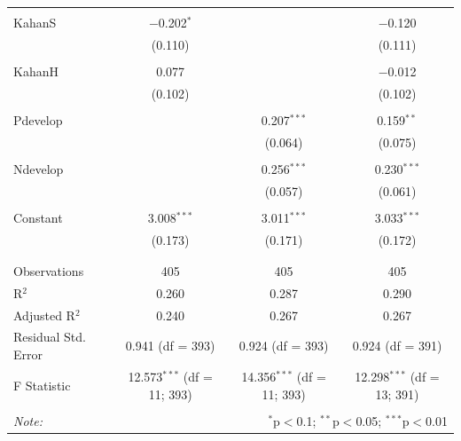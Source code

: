 \documentclass[
]{article}
\begin{document}
\begin{table}[!htbp]
\begin{tabular}{@{\extracolsep{5pt}}lccc}
  & & & \\ 
 KahanS & $-$0.202$^{*}$ &  & $-$0.120 \\ 
  & (0.110) &  & (0.111) \\ 
  & & & \\ 
 KahanH & 0.077 &  & $-$0.012 \\ 
  & (0.102) &  & (0.102) \\ 
  & & & \\ 
 Pdevelop &  & 0.207$^{***}$ & 0.159$^{**}$ \\ 
  &  & (0.064) & (0.075) \\ 
  & & & \\ 
 Ndevelop &  & 0.256$^{***}$ & 0.230$^{***}$ \\ 
  &  & (0.057) & (0.061) \\ 
  & & & \\ 
 Constant & 3.008$^{***}$ & 3.011$^{***}$ & 3.033$^{***}$ \\ 
  & (0.173) & (0.171) & (0.172) \\ 
  & & & \\ 
\hline \\[-1.8ex] 
Observations & 405 & 405 & 405 \\ 
R$^{2}$ & 0.260 & 0.287 & 0.290 \\ 
Adjusted R$^{2}$ & 0.240 & 0.267 & 0.267 \\ 
Residual Std. Error & 0.941 (df = 393) & 0.924 (df = 393) & 0.924 (df = 391) \\ 
F Statistic & 12.573$^{***}$ (df = 11; 393) & 14.356$^{***}$ (df = 11; 393) & 12.298$^{***}$ (df = 13; 391) \\ 
\hline 
\hline \\[-1.8ex] 
\textit{Note:}  & \multicolumn{3}{r}{$^{*}$p$<$0.1; $^{**}$p$<$0.05; $^{***}$p$<$0.01} \\ 
\end{tabular} 
\end{table} 
\endgroup

\newpage
\end{document}
